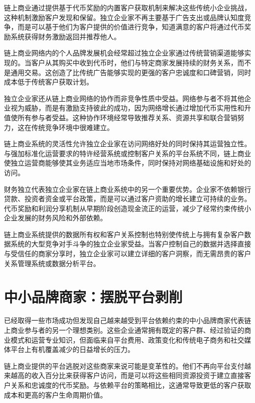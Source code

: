 \documentclass[
  Letterpaper,
]{scrbook}
\begin{document}
链上商业通过提供基于代币奖励的内置客户获取机制来解决这些传统小企业挑战，这种机制激励客户发现和保留。独立企业家不再主要基于广告支出或品牌认知度竞争，而是可以基于他们为客户提供的价值进行竞争，知道满意的客户将通过代币奖励系统获得财务激励返回并推荐他人。

链上商业网络内的个人品牌发展机会经常超过独立企业家通过传统营销渠道能够实现的。当客户从其购买中收到代币时，他们与特定商家发展持续的财务关系，而不是通用交易。这创造了比传统广告能够实现的更强的客户忠诚度和口碑营销，同时成本低于传统客户获取计划。

独立企业家还从链上商业网络的协作而非竞争性质中受益。网络参与者不将其他企业视为威胁，而是有激励支持彼此的成功，因为网络增长通过增加代币实用性和升值使所有参与者受益。这种协作环境经常导致推荐关系、资源共享和联合营销努力，这在传统竞争环境中很难建立。

链上商业系统的灵活性允许独立企业家在访问网络好处的同时保持其运营独立性。与强加标准化运营要求的特许经营系统或控制客户关系的平台系统不同，链上商业使独立运营商能够使其业务适应当地市场条件，同时保持对网络基础设施和好处的访问。

财务独立代表独立企业家在链上商业系统中的另一个重要优势。企业家不依赖银行贷款、投资者资金或平台政策，而是可以通过客户资助的增长建立可持续的业务。代币奖励和利润分享机制从早期阶段创造现金流正的运营，减少了经常约束传统小企业发展的财务风险和外部依赖。

链上商业系统提供的数据所有权和客户关系控制也特别使传统上与拥有复杂客户数据系统的大型竞争对手斗争的独立企业家受益。当客户控制自己的数据并选择直接与受信任的商家分享时，独立企业家可以建立详细的客户洞察，而无需昂贵的客户关系管理系统或数据分析平台。

\section{中小品牌商家：摆脱平台剥削}\label{ux4e2dux5c0fux54c1ux724cux5546ux5bb6ux6446ux8131ux5e73ux53f0ux5265ux524a}

已经取得一些市场成功但发现自己越来越受到平台依赖约束的中小品牌商家代表链上商业参与者的另一个理想类别。这些企业通常拥有既定的客户群、经过验证的商业模式和运营专业知识，但面临来自平台费用、政策变化和传统电子商务和社交媒体平台上有机覆盖减少的日益增长的压力。

链上商业提供的平台逃脱对这些商家来说可能是变革性的。他们不再向平台支付越来越高的收入百分比来获得客户访问，而是可以将这些相同资源投资于建立直接客户关系和忠诚度的代币奖励。与依赖平台的策略相比，这通常导致更低的客户获取成本和更高的客户生命周期价值。
\end{document}
